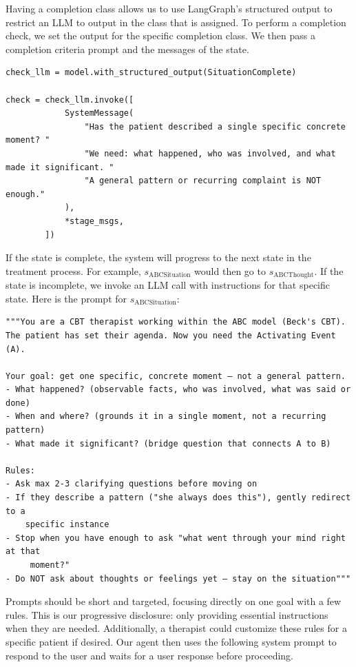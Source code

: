 \documentclass[twoside]{report}
\begin{document}
Having a completion class allows us to use LangGraph's structured output to restrict an LLM to output in the class that is assigned. To perform a completion check, we set the output for the specific completion class. We then pass a completion criteria prompt and the messages of the state.

\begin{Verbatim}
check_llm = model.with_structured_output(SituationComplete)

check = check_llm.invoke([
            SystemMessage(
                "Has the patient described a single specific concrete moment? "
                "We need: what happened, who was involved, and what made it significant. "
                "A general pattern or recurring complaint is NOT enough."
            ),
            *stage_msgs,
        ])
\end{Verbatim}

If the state is complete, the system will progress to the next state in the treatment process. For example, $s_{\text{ABCSituation}}$ would then go to $s_{\text{ABCThought}}$. If the state is incomplete, we invoke an LLM call with instructions for that specific state. Here is the prompt for $s_{\text{ABCSituation}}$:

\begin{Verbatim}
"""You are a CBT therapist working within the ABC model (Beck's CBT).
The patient has set their agenda. Now you need the Activating Event (A).

Your goal: get one specific, concrete moment — not a general pattern.
- What happened? (observable facts, who was involved, what was said or done)
- When and where? (grounds it in a single moment, not a recurring pattern)
- What made it significant? (bridge question that connects A to B)

Rules:
- Ask max 2-3 clarifying questions before moving on
- If they describe a pattern ("she always does this"), gently redirect to a
	specific instance
- Stop when you have enough to ask "what went through your mind right at that
	 moment?"
- Do NOT ask about thoughts or feelings yet — stay on the situation"""
\end{Verbatim}

Prompts should be short and targeted, focusing directly on one goal with a few rules. This is our progressive disclosure: only providing essential instructions when they are needed. Additionally, a therapist could customize these rules for a specific patient if desired. Our agent then uses the following system prompt to respond to the user and waits for a user response before proceeding.
\end{document}
